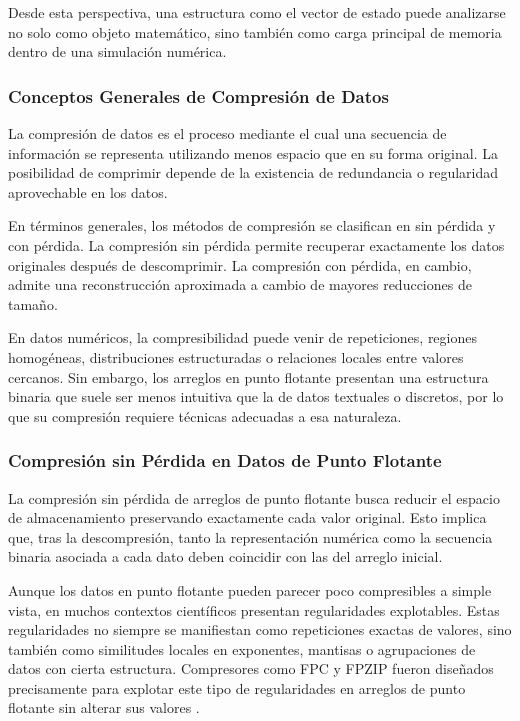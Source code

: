 Desde esta perspectiva, una estructura como el vector de estado puede analizarse no solo como objeto matemático, sino también como carga principal de memoria dentro de una simulación numérica.

\subsubsection{Conceptos Generales de Compresión de Datos}

La compresión de datos es el proceso mediante el cual una secuencia de información se representa utilizando menos espacio que en su forma original. La posibilidad de comprimir depende de la existencia de redundancia o regularidad aprovechable en los datos.

En términos generales, los métodos de compresión se clasifican en sin pérdida y con pérdida. La compresión sin pérdida permite recuperar exactamente los datos originales después de descomprimir. La compresión con pérdida, en cambio, admite una reconstrucción aproximada a cambio de mayores reducciones de tamaño.

En datos numéricos, la compresibilidad puede venir de repeticiones, regiones homogéneas, distribuciones estructuradas o relaciones locales entre valores cercanos. Sin embargo, los arreglos en punto flotante presentan una estructura binaria que suele ser menos intuitiva que la de datos textuales o discretos, por lo que su compresión requiere técnicas adecuadas a esa naturaleza.

\subsubsection{Compresión sin Pérdida en Datos de Punto Flotante}

La compresión sin pérdida de arreglos de punto flotante busca reducir el espacio de almacenamiento preservando exactamente cada valor original. Esto implica que, tras la descompresión, tanto la representación numérica como la secuencia binaria asociada a cada dato deben coincidir con las del arreglo inicial.

Aunque los datos en punto flotante pueden parecer poco compresibles a simple vista, en muchos contextos científicos presentan regularidades explotables. Estas regularidades no siempre se manifiestan como repeticiones exactas de valores, sino también como similitudes locales en exponentes, mantisas o agrupaciones de datos con cierta estructura. Compresores como FPC y FPZIP fueron diseñados precisamente para explotar este tipo de regularidades en arreglos de punto flotante sin alterar sus valores \parencite{burtscher2009fpc,lindstrom2006fpzip}.

